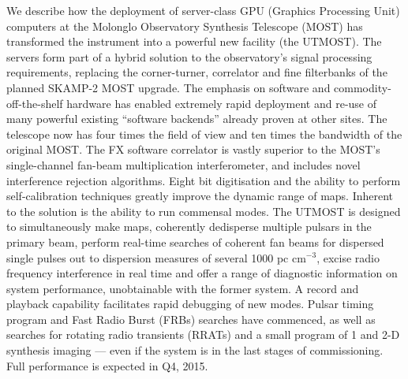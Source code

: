 We describe how the deployment of server-class GPU (Graphics Processing Unit) computers at the Molonglo Observatory Synthesis Telescope (MOST) has transformed the instrument into a powerful new facility (the UTMOST). The servers form part of a hybrid solution to the observatory's signal processing requirements, replacing the corner-turner, correlator and fine filterbanks of the planned SKAMP-2 MOST upgrade. The emphasis on software and commodity-off-the-shelf hardware has enabled extremely rapid deployment and re-use of many powerful existing ``software backends'' already proven at other sites. The telescope now has four times the field of view and ten times the bandwidth of the original MOST. The FX software correlator is vastly superior to the MOST's single-channel fan-beam multiplication interferometer, and includes novel interference rejection algorithms. Eight bit digitisation and the ability to perform self-calibration techniques greatly improve the dynamic range of maps. Inherent to the solution is the ability to run commensal modes. The UTMOST is designed to simultaneously make maps, coherently dedisperse multiple pulsars in the primary beam, perform real-time searches of coherent fan beams for dispersed single pulses out to dispersion measures of several 1000 pc cm$^{-3}$, excise radio frequency interference in real time and offer a range of diagnostic information on system performance, unobtainable with the former system. A record and playback capability facilitates rapid debugging of new modes. Pulsar timing program and Fast Radio Burst (FRBs) searches have commenced, as well as searches for rotating radio transients (RRATs) and a small program of 1 and 2-D synthesis imaging --- even if the system is in the last stages of commissioning. Full performance is expected in Q4, 2015.   
    